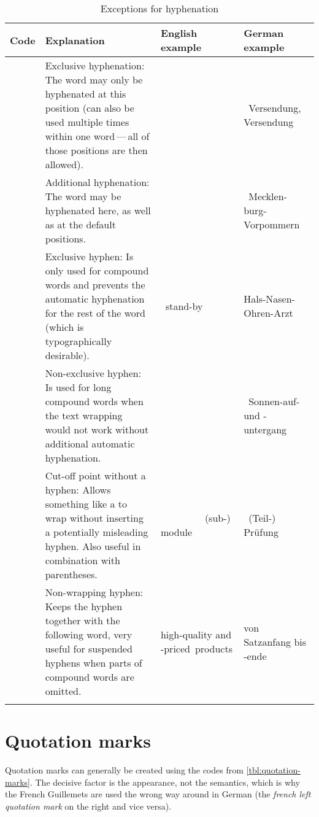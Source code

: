 \setlength\LTleft{-2cm}
\begin{longtable}{@{}lp{8cm}p{3cm}p{3cm}@{}}
	\toprule
	Code      & Explanation & English example & German example \\
	\midrule
	\endhead
	\code{latex}{\textbackslash -} & Exclusive hyphenation: The word may only be hyphenated at this position (can also be used multiple times within one word\,---\,all of those positions are then allowed). & & $\qquad\qquad\qquad$~Vers\-endung, Ver\-sendung \\
	\code{latex}{"-} & Additional hyphenation: The word may be hyphenated here, as well as at the default positions. & & $\qquad\quad$~Mecklen- burg-Vorpommern \\
	\code{latex}{-}  & Exclusive hyphen: Is only used for compound words and prevents the automatic hyphenation for the rest of the word (which is typographically desirable). & $\qquad\qquad\quad$~stand-by & Hals-Nasen-Ohren-Arzt \\
	\code{latex}{"=} & Non-exclusive hyphen: Is used for long compound words when the text wrapping would not work without additional automatic hyphenation. & & $\qquad\qquad$~Sonnen-auf- und -untergang \\
	\code{latex}{""} & Cut-off point without a hyphen: Allows something like a \acro{url} to wrap without inserting a potentially misleading hyphen. Also useful in combination with parentheses. & $\qquad\qquad$~(sub-) module & $\qquad\qquad$~(Teil-) Prüfung \\
	\code{latex}{"\textasciitilde} & Non-wrapping hyphen: Keeps the hyphen together with the following word, very useful for suspended hyphens when parts of compound words are omitted. & high-quality and \mbox{-priced products} & von Satzanfang bis \mbox{-ende} \\ %
	\bottomrule
	\caption{Exceptions for hyphenation}
	\label{tbl:separators}
\end{longtable}

\section{Quotation marks}
Quotation marks can generally be created using the codes from \cref{tbl:quotation-marks}.
The decisive factor is the appearance, not the semantics, which is why the French Guillemets are used the wrong way around in German
(the \emph{french left quotation mark} on the right and vice versa).


